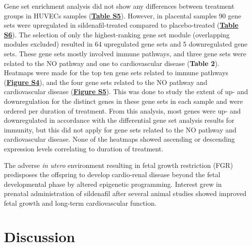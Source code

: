 \documentclass[authordate, empirical]{jote-new-article}
\begin{document}
Gene set enrichment analysis did not show any differences between treatment groups in HUVECs samples (\textbf{\href{https://journal.trialanderror.org/pub/prenatal-sildenafil-pregnancies\#supplementary-materials}{Table S5}}). However, in placental samples 90 gene sets were upregulated in sildenafil-treated compared to placebo-treated (\textbf{\href{https://journal.trialanderror.org/pub/prenatal-sildenafil-pregnancies\#supplementary-materials}{Table S6}}). The selection of only the highest-ranking gene set module (overlapping modules excluded) resulted in 64 upregulated gene sets and 5 downregulated gene sets. These gene sets mostly involved immune pathways, and three gene sets were related to the NO pathway and one to cardiovascular disease (\textbf{Table 2}). Heatmaps were made for the top ten gene sets related to immune pathways (\textbf{\href{https://journal.trialanderror.org/pub/prenatal-sildenafil-pregnancies\#supplementary-materials}{Figure S4}}), and the four gene sets related to the NO pathway and cardiovascular disease (\textbf{\href{https://journal.trialanderror.org/pub/prenatal-sildenafil-pregnancies\#supplementary-materials}{Figure S5}}). This was done to study the extent of up- and downregulation for the distinct genes in these gene sets in each sample and were ordered per duration of treatment. From this analysis, most genes were up- and downregulated in accordance with the differential gene set analysis results for immunity, but this did not apply for gene sets related to the NO pathway and cardiovascular disease. None of the heatmaps showed ascending or descending expression levels correlating to duration of treatment.



The adverse \emph{in utero }environment resulting in fetal growth restriction (FGR) predisposes the offspring to develop cardio-renal disease beyond the fetal developmental phase by altered epigenetic programming. Interest grew in prenatal administration of sildenafil after several animal studies showed improved fetal growth and long-term cardiovascular function.



\section{Discussion}
\end{document}

